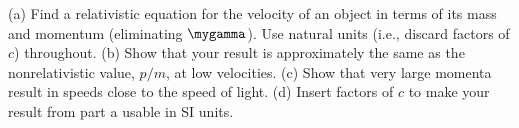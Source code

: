 (a) Find a relativistic equation for the velocity of an
object in terms of its mass and momentum (eliminating
$\mygamma$). Use natural units (i.e., discard factors of $c$) throughout.\answercheck\hwendpart
(b) Show that your result
is approximately the same as the nonrelativistic value, $p/m$, at
low velocities.\hwendpart
(c) Show that very large momenta result in
speeds close to the speed of light.\hwendpart
(d) Insert factors of $c$ to make your result from part a usable in SI units.\answercheck\hwendpart
